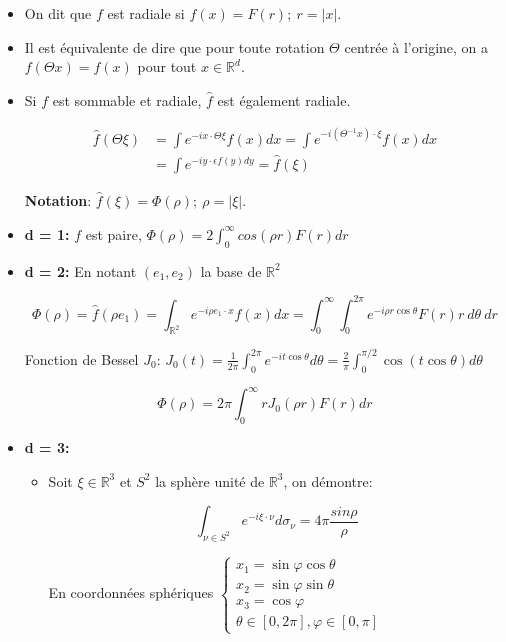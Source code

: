 \documentclass[10pt,a4paper,oneside]{article}
\begin{document}
\begin{itemize}
\item
On dit que $f$ est radiale si $f(x) = F(r);\ r = |x|.$

\item
Il est équivalente de dire que pour toute rotation $\Theta$ centrée à l'origine, on a $f(\Theta x) = f(x)$ pour tout $x \in \mathbb{R}^d$.

\item
Si $f$ est sommable et radiale, $\hat{f}$ est également radiale.

\begin{align*}
\hat{f}(\Theta \xi) &= \int e^{-ix \cdot \Theta\xi} f(x) dx = \int e^{-i(\Theta^{-1}x) \cdot \xi} f(x) dx \\
&= \int e^{-iy \cdot \epsilon f(y) dy} = \hat{f}(\xi)
\end{align*}

\textbf{Notation}: $\hat{f}(\xi) = \Phi(\rho);\ \rho = |\xi|$.

\item
\textbf{d = 1:} $f$ est paire, $\Phi(\rho) = 2 \int_0^\infty cos(\rho r) F(r) dr$

\item
\textbf{d = 2:} En notant $(e_1,e_2)$ la base de $\mathbb{R}^2$

\[ \Phi(\rho) = \hat{f}(\rho e_1) = \int_{\mathbb{R}^2} e^{-i\rho e_1 \cdot x} f(x) dx = \int_0^\infty \int_0^{2\pi} e^{-i\rho r \cos \theta} F(r) r\ d\theta\ dr \]

Fonction de Bessel $J_0$: $J_0(t) = \frac{1}{2\pi} \int_0^{2\pi} e^{-it \cos \theta} d\theta = \frac{2}{\pi} \int_0^{\pi / 2} \cos(t \cos\theta) d\theta$

\[ \Phi(\rho) = 2\pi \int_0^\infty r J_0(\rho r) F(r) dr \]

\item
\textbf{d = 3:}

\begin{itemize}
\item
Soit $\xi \in \mathbb{R}^3$ et $S^2$ la sphère unité de $\mathbb{R}^3$, on démontre:

\[ \int_{\nu \in S^2} e^{-i \xi \cdot \nu} d \sigma_\nu = 4\pi \frac{sin \rho}{\rho} \]

En coordonnées sphériques
$\begin{cases}
x_1 = \sin \varphi \cos \theta \\
x_2 = \sin \varphi \sin \theta \\
x_3 = \cos \varphi \\
\theta \in [0,2\pi], \varphi \in [0,\pi]
\end{cases}$


\end{itemize}
\end{itemize}
\end{document}
